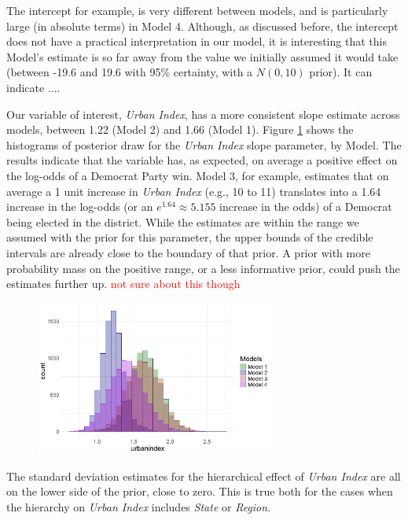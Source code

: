 \documentclass[12pt]{article}
\newcommand{\red}[1]{\textcolor{red}{#1}}
\begin{document}
The intercept for example, is very different between models, and is particularly large (in absolute terms) in Model 4. Although, as discussed before, the intercept does not have a practical interpretation in our model, it is interesting that this Model's estimate is so far away from the value we initially assumed it would take (between -19.6 and 19.6 with 95\% certainty, with a $N(0,10)$ prior). It can indicate ....

Our variable of interest, \textit{Urban Index}, has a more consistent slope estimate across models, between 1.22 (Model 2) and 1.66 (Model 1).
Figure \ref{fig:urbanindex_estimates} shows the histograms of posterior draw for the \textit{Urban Index} slope parameter, by Model.
The results indicate that the variable has, as expected, on average a positive effect on the log-odds of a Democrat Party win.
Model 3, for example, estimates that on average a 1 unit increase in \textit{Urban Index} (e.g., 10 to 11) translates into a 1.64 increase in the log-odds (or an $e^{1.64} \approx 5.155 $ increase in the odds) of a Democrat being elected in the district.
While the estimates are within the range we assumed with the prior for this parameter, the upper bounds of the credible intervals are already close to the boundary of that prior. 
A prior with more probability mass on the positive range, or a less informative prior, could push the estimates further up. \red{not sure about this though}

\begin{figure}
	\centering
	\includegraphics[width=0.7\textwidth]{results/urb_post_all_models.jpeg}
	\caption{}
	\label{fig:urbanindex_estimates}
\end{figure}

The standard deviation estimates for the hierarchical effect of \textit{Urban Index}  are all on the lower side of the prior, close to zero. This is true both for the cases when the hierarchy on \textit{Urban Index} includes \textit{State} or \textit{Region}.
\end{document}
